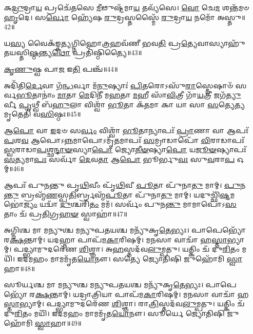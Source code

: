 𑌕\-\ul{𑌦𑍍𑌰𑍁}\-𑌦𑍍𑌰𑌾\-\ul{𑌯} 𑌪𑍍𑌰𑌚𑍇᳴𑌤𑌸𑍇 \ul{𑌮𑍀}\-𑌢𑍁𑌷𑍍𑌟᳴𑌮𑌾\-\ul{𑌯} 𑌤𑌵𑍍𑌯᳴𑌸𑍇। 
\-\ul{𑌵𑍋} 𑌚𑍇\-\ul{𑌮} 𑌶𑌨𑍍𑌤᳴𑌮𑍞 \ul{𑌹𑍃}\-𑌦𑍇। 
𑌸\-\ul{𑌰𑍍𑌵𑍋} 𑌹𑍍𑌯𑍇᳴𑌷 \ul{𑌰𑍁}\-𑌦𑍍𑌰𑌸𑍍𑌤𑌸𑍍𑌮𑍈᳴ \ul{𑌰𑍁}\-𑌦𑍍𑌰𑌾\-\ul{𑌯} 𑌨𑌮𑍋᳴ 𑌅𑌸𑍍𑌤𑍁॥42॥
\anuvakamend

𑌯\-\ul{𑌸𑍍𑌯} 𑌵𑍈𑌕᳴𑌙𑍍𑌕𑌤𑍍𑌯𑌗𑍍𑌨𑌿𑌹𑍋\-\ul{𑌤𑍍𑌰}\-𑌹𑌵᳴𑌣𑍀 𑌭𑌵\-\ul{𑌤𑌿} 𑌪𑍍𑌰\-\ul{𑌤𑍍𑌯𑍇}\-𑌵𑌾𑌸𑍍𑌯𑌾𑌹𑍁᳴𑌤𑌯\-𑌸𑍍𑌤𑌿\-\ul{𑌷𑍍𑌠}\-𑌨𑍍𑌤𑍍𑌯\-\ul{𑌥𑍋} 𑌪𑍍𑌰𑌤𑌿᳴𑌷𑍍𑌠𑌿𑌤𑍍𑌯𑍈॥43॥
\anuvakamend


\-\ul{𑌕𑍃}\-\-\ul{𑌣𑍁}\-𑌷𑍍𑌵 𑌪𑌾\-\ul{𑌜} 𑌇\-\ul{𑌤𑌿} 𑌪𑌞𑍍𑌚᳴॥44॥
\anuvakamend

𑌅𑌦𑌿᳴𑌤𑌿\-\ul{𑌰𑍍𑌦𑍇}\-𑌵𑌾 𑌗᳴\-\ul{𑌨𑍍𑌧}\-𑌰𑍍𑌵𑌾 𑌮᳴\-\ul{𑌨𑍁}\-𑌷𑍍𑌯𑌾𑌃॑ \ul{𑌪𑌿}\-𑌤𑌰𑍋𑌽𑌸𑍁᳴\-\ul{𑌰𑌾}\-𑌸𑍍𑌤𑍇𑌷𑌾𑍞᳴ 𑌸𑌰𑍍𑌵\-\ul{𑌭𑍂}\-𑌤𑌾𑌨𑌾𑌂॑ \ul{𑌮𑌾}\-𑌤𑌾 \ul{𑌮𑍇}\-𑌦𑌿𑌨𑍀᳴ 𑌮\-\ul{𑌹}\-𑌤𑌾 \ul{𑌮}\-𑌹𑍀 𑌸𑌾᳴\-\ul{𑌵𑌿}\-𑌤𑍍𑌰𑍀 𑌗𑌾᳴\-\ul{𑌯}\-𑌤𑍍𑌰𑍀 𑌜𑌗᳴\-\ul{𑌤𑍍𑌯𑍁}\-𑌰𑍍𑌵𑍀 \ul{𑌪𑍃}\-𑌥𑍍𑌵𑍀 𑌬᳴\-\ul{𑌹𑍁}\-𑌲𑌾 𑌵𑌿𑌶𑍍𑌵𑌾᳴ \ul{𑌭𑍂}\-𑌤𑌾 𑌕᳴\-\ul{𑌤}\-𑌮𑌾 𑌕𑌾 𑌯𑌾 𑌸𑌾 \ul{𑌸}\-𑌤𑍍𑌯𑍇\-\ul{𑌤𑍍𑌯}\-𑌮𑍃𑌤𑍇𑌤𑌿᳴ 𑌵\-\ul{𑌸𑌿}\-𑌷𑍍𑌠𑌃॥45॥
\anuvakamend

𑌆\-\ul{𑌪𑍋} 𑌵𑌾 \ul{𑌇}\-𑌦𑍞 𑌸\-\ul{𑌰𑍍𑌵𑌂} 𑌵𑌿𑌶𑍍𑌵𑌾᳴ \ul{𑌭𑍂}\-𑌤𑌾𑌨𑍍𑌯𑌾𑌪𑌃᳴ \ul{𑌪𑍍𑌰𑌾}\-𑌣𑌾 𑌵𑌾 𑌆𑌪𑌃᳴ \ul{𑌪}\-𑌶\-\ul{𑌵} 𑌆𑌪𑍋𑌽\-\ul{𑌨𑍍𑌨}\-𑌮𑌾𑌪𑍋𑌽𑌮𑍃᳴\-\ul{𑌤}\-𑌮𑌾𑌪𑌃᳴ \ul{𑌸}\-𑌮𑍍𑌰𑌾𑌡𑌾𑌪𑍋᳴ \ul{𑌵𑌿}\-𑌰𑌾𑌡𑌾𑌪𑌃᳴ \ul{𑌸𑍍𑌵}\-𑌰𑌾𑌡𑌾\-\ul{𑌪}\-𑌶𑍍𑌛\-\ul{𑌨𑍍𑌦𑌾}\-\-\ul{𑍟}\-𑌸𑍍𑌯𑌾\-\ul{𑌪𑍋} 𑌜𑍍𑌯𑍋\-\ul{𑌤𑍀}\-\-\ul{𑍟}\-𑌷𑍍𑌯𑌾\-\ul{𑌪𑍋} 𑌯\-\ul{𑌜𑍂}\-\-\ul{𑍟}\-𑌷𑍍𑌯𑌾𑌪𑌃᳴ \ul{𑌸}\-𑌤𑍍𑌯𑌮𑌾\-\ul{𑌪𑌃} 𑌸𑌰𑍍𑌵𑌾᳴ \ul{𑌦𑍇}\-𑌵\-\ul{𑌤𑌾} 𑌆\-\ul{𑌪𑍋} 𑌭𑍂𑌰𑍍𑌭𑍁\-\ul{𑌵𑌃} 𑌸𑍁\-\ul{𑌵}\-𑌰𑌾\-\ul{𑌪} 𑌓𑌮𑍍॥46॥
\anuvakamend

𑌆𑌪𑌃᳴ 𑌪𑍁𑌨𑌨𑍍𑌤𑍁 𑌪𑍃\-\ul{𑌥𑌿}\-𑌵𑍀𑌂 𑌪𑍃᳴\-\ul{𑌥𑌿}\-𑌵𑍀 \ul{𑌪𑍂}\-𑌤𑌾 𑌪𑍁᳴𑌨𑌾\-\ul{𑌤𑍁} 𑌮𑌾𑌮𑍍। 
\-\ul{𑌪𑍁}\-𑌨\-\ul{𑌨𑍍𑌤𑍁} 𑌬𑍍𑌰𑌹𑍍𑌮᳴\-\ul{𑌣}\-𑌸𑍍𑌪\-\ul{𑌤𑌿}\-𑌰𑍍𑌬𑍍𑌰𑌹𑍍𑌮᳴\-\ul{𑌪𑍂}\-𑌤𑌾 𑌪𑍁᳴𑌨𑌾\-\ul{𑌤𑍁} 𑌮𑌾𑌮𑍍। 
𑌯𑌦𑍁𑌚𑍍𑌛𑌿᳴\-\ul{𑌷𑍍𑌟}\-𑌮𑌭𑍋॑\-\ul{𑌜𑍍𑌯𑌂} 𑌯𑌦𑍍𑌵𑌾᳴ \ul{𑌦𑍁}\-𑌶𑍍𑌚𑌰𑌿᳴\-\ul{𑌤𑌂} 𑌮𑌮᳴। 
𑌸𑌰𑍍𑌵𑌂᳴ 𑌪𑍁𑌨\-\ul{𑌨𑍍𑌤𑍁} 𑌮𑌾𑌮𑌾𑌪𑍋᳴𑌽\-\ul{𑌸}\-𑌤𑌾𑌂 𑌚᳴ 𑌪𑍍𑌰\-\ul{𑌤𑌿}\-𑌗𑍍𑌰\-\ul{𑌹}\-\-\ul{𑍟} 𑌸𑍍𑌵𑌾𑌹𑌾॑॥47॥
\anuvakamend


𑌅𑌗𑍍𑌨𑌿𑌶𑍍𑌚 𑌮𑌾 𑌮𑌨𑍍𑌯𑍁𑌶𑍍𑌚 𑌮𑌨𑍍𑌯𑍁𑌪𑌤𑌯𑌶𑍍𑌚 𑌮𑌨𑍍𑌯𑍁᳴𑌕𑍃\-\ul{𑌤𑍇}\-𑌭𑍍𑌯𑌃। 
𑌪𑌾𑌪𑍇𑌭𑍍𑌯𑍋᳴ 𑌰\-\ul{𑌕𑍍𑌷}\-𑌨𑍍𑌤𑌾𑌮𑍍। 
𑌯𑌦𑌹𑍍𑌨𑌾 𑌪𑌾𑌪᳴𑌮\-\ul{𑌕𑌾}\-𑌰𑌿𑌷𑌮𑍍। 
𑌮𑌨𑌸𑌾 𑌵𑌾𑌚𑌾᳴ 𑌹\-\ul{𑌸𑍍𑌤𑌾}\-𑌭𑍍𑌯𑌾𑌮𑍍। 
𑌪𑌦𑍍𑌭𑍍𑌯𑌾𑌮𑍁𑌦𑌰𑍇᳴𑌣 \ul{𑌶𑌿}\-𑌶𑍍𑌞𑌾। 
𑌅\-\ul{𑌹}\-𑌸𑍍𑌤𑌦᳴𑌵\-\ul{𑌲𑍁}\-𑌮𑍍𑌪𑌤𑍁। 
𑌯𑌤𑍍𑌕𑌿𑌂 𑌚᳴ 𑌦𑍁\-\ul{𑌰𑌿}\-𑌤𑌂 𑌮𑌯𑌿᳴। 
𑌇𑌦𑌮𑌹𑌂 𑌮𑌾𑌮𑌮𑍃᳴𑌤\-\ul{𑌯𑍋}\-𑌨𑍗। 
𑌸𑌤𑍍𑌯𑍇 𑌜𑍍𑌯𑍋𑌤𑌿𑌷𑌿 𑌜𑍁𑌹𑍋᳴𑌮𑌿 \ul{𑌸𑍍𑌵𑌾}\-𑌹𑌾॥48॥
\anuvakamend


𑌸𑍂𑌰𑍍𑌯𑌶𑍍𑌚 𑌮𑌾 𑌮𑌨𑍍𑌯𑍁𑌶𑍍𑌚 𑌮𑌨𑍍𑌯𑍁𑌪𑌤𑌯𑌶𑍍𑌚 𑌮𑌨𑍍𑌯𑍁᳴𑌕𑍃\-\ul{𑌤𑍇}\-𑌭𑍍𑌯𑌃। 
𑌪𑌾𑌪𑍇𑌭𑍍𑌯𑍋᳴ 𑌰\-\ul{𑌕𑍍𑌷}\-𑌨𑍍𑌤𑌾𑌮𑍍। 
𑌯𑌦𑍍𑌰𑌾𑌤𑍍𑌰𑌿𑌯𑌾 𑌪𑌾𑌪᳴𑌮\-\ul{𑌕𑌾}\-𑌰𑌿𑌷𑌮𑍍। 
𑌮𑌨𑌸𑌾 𑌵𑌾𑌚𑌾᳴ 𑌹\-\ul{𑌸𑍍𑌤𑌾}\-𑌭𑍍𑌯𑌾𑌮𑍍। 
𑌪𑌦𑍍𑌭𑍍𑌯𑌾𑌮𑍁𑌦𑌰𑍇᳴𑌣 \ul{𑌶𑌿}\-𑌶𑍍𑌞𑌾। 
𑌰𑌾\-\ul{𑌤𑍍𑌰𑌿}\-𑌸𑍍𑌤𑌦᳴𑌵\-\ul{𑌲𑍁}\-𑌮𑍍𑌪𑌤𑍁। 
𑌯𑌤𑍍𑌕𑌿𑌂 𑌚᳴ 𑌦𑍁\-\ul{𑌰𑌿}\-𑌤𑌂 𑌮𑌯𑌿᳴। 
𑌇𑌦𑌮𑌹𑌂 𑌮𑌾𑌮𑌮𑍃᳴𑌤\-\ul{𑌯𑍋}\-𑌨𑍗। 
𑌸𑍂𑌰𑍍𑌯𑍇 𑌜𑍍𑌯𑍋𑌤𑌿𑌷𑌿 𑌜𑍁𑌹𑍋᳴𑌮𑌿 \ul{𑌸𑍍𑌵𑌾}\-𑌹𑌾॥49॥
\anuvakamend

